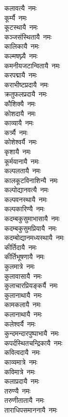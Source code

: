 \begin{flushleft}
\begin{multicols}{2}
कलावत्यै~नमः\\
कूर्म्यै~नमः\\
कूटस्थायै~नमः\\
कञ्जसंस्थितायै~नमः\\
कालिकायै~नमः\\
कल्मषघ्न्यै~नमः\\
कमनीयजटान्वितायै~नमः\\
करपद्मायै~नमः\\
कराभीष्टप्रदायै~नमः\\
क्रतुफलप्रदायै~नमः\hfill{}\\
कौशिक्यै~नमः\\
कोशदायै~नमः\\
काव्यायै~नमः\\
कर्त्र्यै~नमः\\
कोशेश्वर्यै~नमः\\
कृशायै~नमः\\
कूर्मयानायै~नमः\\
कल्पलतायै~नमः\\
कालकूटविनाशिन्यै~नमः\\
कल्पोद्यानवत्यै~नमः\hfill{}\\
कल्पवनस्थायै~नमः\\
कल्पकारिण्यै~नमः\\
कदम्बकुसुमाभासायै~नमः\\
कदम्बकुसुमप्रियायै~नमः\\
कदम्बोद्यानमध्यस्थायै~नमः\\
कीर्तिदायै~नमः\\
कीर्तिभूषणायै~नमः\\
कुलमात्रे~नमः\\
कुलावासायै~नमः\\
कुलाचारप्रियङ्कर्यै~नमः\hfill{}\\
कुलानाथायै~नमः\\
कामकलायै~नमः\\
कलानाथायै~नमः\\
कलेश्वर्यै~नमः\\
कुन्दमन्दारपुष्पाभायै~नमः\\
कपर्दस्थितचन्द्रिकायै~नमः\\
कवित्वदायै~नमः\\
काव्यमात्रे~नमः\\
कविमात्रे~नमः\\
कलाप्रदायै~नमः\hfill{}\\
तरुण्यै~नमः\\
तरुणीतातायै~नमः\\
ताराधिपसमाननायै~नमः\\

\end{multicols}
\end{flushleft}
